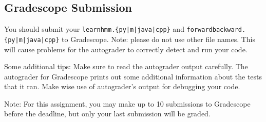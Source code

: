 \documentclass[11pt,addpoints,answers]{exam}
\numberwithin{equation}{section} %
\numberwithin{figure}{section} %
\numberwithin{table}{section} %
\begin{document}
\subsection{Gradescope Submission}

You should submit your \texttt{learnhmm.\{py|m|java|cpp\}} and %
\texttt{forwardbackward.\{py|m|java|cpp\}} to Gradescope.
Note: please do not use other file names. This will cause problems for the autograder to correctly detect and run your code.

Some additional tips: 
Make sure to read the autograder output carefully. The autograder for Gradescope prints out some additional 
information about the tests that it ran. Make wise use of autograder's output for debugging your code. 

Note: For this assignment, you may make up to 10 submissions to Gradescope before the deadline, but only your last submission will be graded.
   
    
\end{document}
